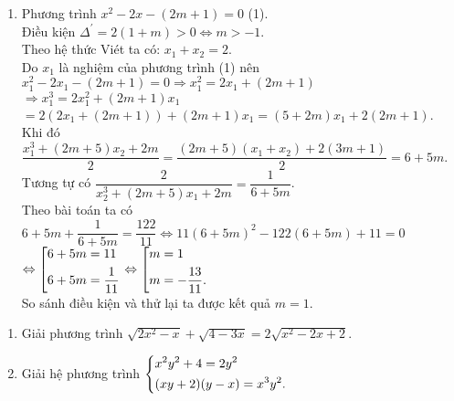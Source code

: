 {\begin{enumerate}[1)]
\begin{enumerate}[a)]
\item Ta có $\dfrac{x}{4}=\sqrt{\dfrac{1009 + \sqrt{2017}}{2}} - \sqrt{\dfrac{1009 - \sqrt{2017}}{2}}$\\
$ =\sqrt{\dfrac{2018 + 2\sqrt{2017}}{4}} - \sqrt{\dfrac{2018 - 2\sqrt{2017}}{4}}$ \\
$=\dfrac{\sqrt{2017} + 1}{2} - \dfrac{\sqrt{2017} - 1}{2}$ $=1$. Suy ra $x=4$ (thoả mãn).\\
Thay $x=4$ vào biểu thức A ta được $A=\dfrac{\sqrt{4} + 1}{2\sqrt{4} + 3}=\dfrac{3}{7}$. \\
Vậy giá trị của biểu thức A bằng $\dfrac{3}{7}$ khi $\dfrac{x}{4}=\sqrt{\dfrac{1009 + \sqrt{2017}}{2}} - \sqrt{\dfrac{1009 - \sqrt{2017}}{2}}$.
\end{enumerate}
\item Phương trình $x^2 - 2x - (2m + 1)=0$ (1).\\
 Điều kiện $\Delta^{'}=2(1 + m)>0 \Leftrightarrow m> - 1$.\\
Theo hệ thức Viét ta có: $x_1 + x_2=2$. \\
Do $x_1$ là nghiệm của phương trình (1) nên\\
 $x_1^2 - 2x_1 - (2m + 1)=0 \Rightarrow x_1^2=2x_1+(2m + 1)$\\
 $\Rightarrow x_1^{3}=2x_1^2 + (2m + 1)x_1$
 $=2\left(2x_1+(2m + 1)\right) + (2m + 1)x_1=(5 + 2m)x_1 + 2(2m + 1)$. \\
 Khi đó $\dfrac{x_1^3 + (2m + 5)x_2 + 2m}{2}=\dfrac{(2m + 5)(x_1 + x_2) + 2(3m + 1)}{2}=6 + 5m$.\\
Tương tự có $\dfrac{2}{x_2^3 + (2m + 5)x_1 + 2m}=\dfrac{1}{6 + 5m}$.\\
Theo bài toán ta có \\
 $6 + 5m + \dfrac{1}{6 + 5m}=\dfrac{122}{11}\Leftrightarrow 11 {(6 + 5m)}^2 - 122(6 + 5m) + 11=0$
 $\Leftrightarrow  \left[\begin{aligned}& 6 + 5m=11 \\ 
 & 6 + 5m=\dfrac{1}{11}\end{aligned}\right. \Leftrightarrow \left[\begin{aligned}& m=1 \\ 
 & m= - \dfrac{13}{11}.\end{aligned}\right.$ \\
 So sánh điều kiện và thử lại ta được kết quả $m=1. $	
\end{enumerate}
}
\begin{ex}%
 \hfill
\begin{enumerate}[1)]
\item 	Giải phương trình $\sqrt{2x^2 - x} + \sqrt{4 - 3x}=2\sqrt{x^2 - 2x + 2}$. 
\item 	Giải hệ phương trình $\left\{\begin{aligned}& x^2y^2 + 4=2y^2 \\   & (xy + 2)(y - x)=x^3y^2 .\end{aligned}\right.$
\end{enumerate}
\end{ex}
